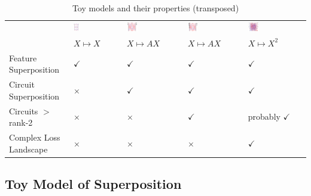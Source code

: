 \documentclass{article}
\theoremstyle{plain}
\theoremstyle{definition}
\theoremstyle{remark}
\begin{document}
\begin{table}[htb]
\begin{tabularx}{\textwidth}{X X X X X}
        \hline
        & \includegraphics[width=0.12\textwidth]{../figures/2a_toy_models_setup.pdf} &
        \includegraphics[width=0.2\textwidth]{../figures/2b_toy_models_setup.pdf} &
        \includegraphics[width=0.2\textwidth]{../figures/2c_toy_models_setup.pdf} &
        \includegraphics[width=0.2\textwidth]{../figures/2d_toy_models_setup.pdf} \\
         & $X \mapsto X$ & $X \mapsto A X$ & $X \mapsto A X$ & $X \mapsto X^2$ \\  
        Feature Superposition & $\checkmark$ & $\checkmark$ & $\checkmark$ & $\checkmark$ \\  
        Circuit Superposition & $\times$ & $\checkmark$ & $\checkmark$ & $\checkmark$ \\  
        Circuits $>$ rank-2 & $\times$ & $\times$ & $\checkmark$ & probably $\checkmark$ \\  
        Complex Loss Landscape & $\times$ & $\times$ & $\times$ & $\checkmark$ \\  
        \bottomrule
    \end{tabularx}
    \caption{Toy models and their properties (transposed)}
    \label{tab:toy_models}
\end{table}

\subsection{Toy Model of Superposition}
\end{document}
